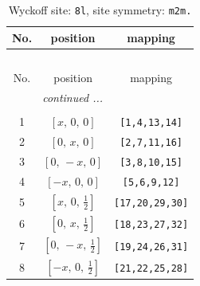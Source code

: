 \documentclass[fleqn,8pt]{jsarticle}
\begin{document}
\begin{longtable}{ccc}
\caption{Wyckoff site: {\tt 8l}, site symmetry: {\tt m2m.}}
 \\
 \hline \hline
No. & position & mapping \\ \hline \endfirsthead

\multicolumn{2}{l}{\tablename\ \thetable{}} \\
 \hline \hline
No. & position & mapping \\ \hline \endhead

 \hline \hline
\multicolumn{2}{r}{\footnotesize\it continued ...} \\ \endfoot

 \hline \hline
\multicolumn{2}{r}{} \\ \endlastfoot

1 & $\left[ x,\, 0,\, 0 \right]$ & {\tt [1,4,13,14]} \\ \hline
2 & $\left[ 0,\, x,\, 0 \right]$ & {\tt [2,7,11,16]} \\ \hline
3 & $\left[ 0,\, - x,\, 0 \right]$ & {\tt [3,8,10,15]} \\ \hline
4 & $\left[ - x,\, 0,\, 0 \right]$ & {\tt [5,6,9,12]} \\ \hline
5 & $\left[ x,\, 0,\, \frac{1}{2} \right]$ & {\tt [17,20,29,30]} \\ \hline
6 & $\left[ 0,\, x,\, \frac{1}{2} \right]$ & {\tt [18,23,27,32]} \\ \hline
7 & $\left[ 0,\, - x,\, \frac{1}{2} \right]$ & {\tt [19,24,26,31]} \\ \hline
8 & $\left[ - x,\, 0,\, \frac{1}{2} \right]$ & {\tt [21,22,25,28]} \\
\end{longtable}
\renewcommand{\arraystretch}{1.2}
\end{document}
